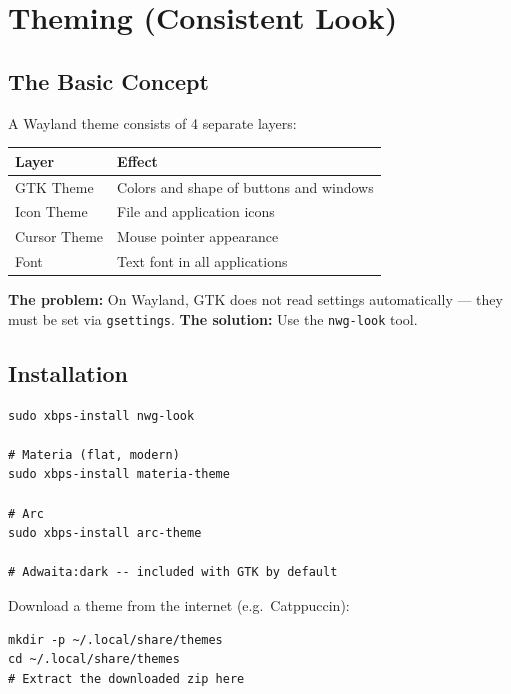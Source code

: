 \documentclass[12pt, a4paper]{book}
\begin{document}
\chapter{Theming (Consistent Look)}

\section{The Basic Concept}

A Wayland theme consists of 4 separate layers:

\begin{center}
\begin{tabularx}{0.85\textwidth}{lL}
\toprule
\textbf{Layer} & \textbf{Effect} \\
\midrule
GTK Theme   & Colors and shape of buttons and windows \\
Icon Theme  & File and application icons \\
Cursor Theme & Mouse pointer appearance \\
Font        & Text font in all applications \\
\bottomrule
\end{tabularx}
\end{center}

\begin{notebox}
\textbf{The problem:} On Wayland, GTK does not read settings automatically --- they must be set via \texttt{gsettings}. \textbf{The solution:} Use the \texttt{nwg-look} tool.
\end{notebox}

\section{Installation}
\begin{lstlisting}
sudo xbps-install nwg-look

# Materia (flat, modern)
sudo xbps-install materia-theme

# Arc
sudo xbps-install arc-theme

# Adwaita:dark -- included with GTK by default
\end{lstlisting}

Download a theme from the internet (e.g.\ Catppuccin):
\begin{lstlisting}
mkdir -p ~/.local/share/themes
cd ~/.local/share/themes
# Extract the downloaded zip here
\end{lstlisting}
\end{document}
